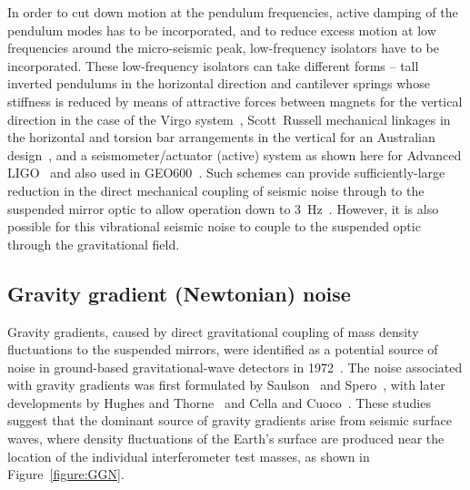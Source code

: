 
In order to cut down motion at the pendulum frequencies, active damping of the
pendulum modes has to be incorporated, and to reduce excess motion at low
frequencies around the micro-seismic peak, low-frequency isolators have to be
incorporated. These low-frequency isolators can take different forms -- tall
inverted pendulums in the horizontal direction and cantilever springs whose
stiffness is reduced by means of attractive forces between magnets for the
vertical direction in the case of the Virgo system~\cite{Losurdo},
Scott~Russell mechanical linkages in the horizontal and torsion bar arrangements
in the vertical for an Australian design~\cite{Winterflood}, and a
seismometer/actuator (active) system as shown here for Advanced
LIGO~\cite{Abbott:2002} and also used in GEO600~\cite{Plissi2}.  Such schemes
can provide sufficiently-large reduction in the direct mechanical coupling of
seismic noise through to the suspended mirror optic to allow operation down to
3~Hz~\cite{Braccini:1993,ETweb}. However, it is also possible for this
vibrational seismic noise to couple to the suspended optic through the
gravitational field.


\subsection{Gravity gradient (Newtonian) noise}
\label{subsection:gravitygradient} 

Gravity gradients, caused by direct gravitational coupling of mass density
fluctuations to the suspended mirrors, were identified as a potential source of
noise in ground-based gravitational-wave detectors in 1972~\cite{Weiss}. The
noise associated with gravity gradients was first formulated by
Saulson~\cite{Saulson1} and Spero~\cite{Spero}, with later developments by
Hughes and Thorne~\cite{Thorne:1998} and Cella and Cuoco~\cite{Beccaria}.
These studies suggest that the dominant source of gravity gradients arise from
seismic surface waves, where density fluctuations of the Earth's surface are
produced near the location of the individual interferometer test masses, as
shown in Figure~\ref{figure:GGN}.
